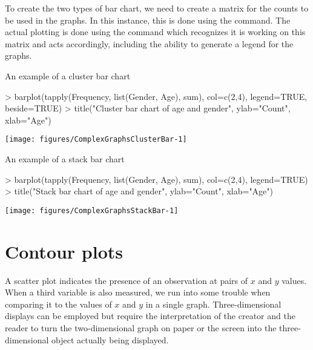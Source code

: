 To create the two types of bar chart, we need to create a matrix for the counts to be used in the graphs. In this instance, this is done using the  command. The actual plotting is done using the  command which recognizes it is working on this matrix and acts accordingly, including the ability to generate a legend for the graphs. 
\begin{exhibit} 
\begin{center} 
\caption{An example of a cluster bar chart} 
\label{ClusterBarChart} 

\begin{Schunk}
\begin{Sinput}
> barplot(tapply(Frequency, list(Gender, Age), sum), col=c(2,4), legend=TRUE, beside=TRUE) 
> title("Cluster bar chart of age and gender", ylab="Count", xlab="Age") 
\end{Sinput}

\texttt{[image: figures/ComplexGraphsClusterBar-1]} \end{Schunk}

\end{center} 
\end{exhibit} 
\begin{exhibit} 
\begin{center} 
\caption{An example of a stack bar chart} 
\label{StackBarChart} 

\begin{Schunk}
\begin{Sinput}
> barplot(tapply(Frequency, list(Gender, Age), sum), col=c(2,4), legend=TRUE) 
> title("Stack bar chart of age and gender", ylab="Count", xlab="Age") 
\end{Sinput}

\texttt{[image: figures/ComplexGraphsStackBar-1]} \end{Schunk}

\end{center} 
\end{exhibit} 
 
 
 
\section{Contour plots} 
 
A scatter plot indicates the presence of an observation at pairs of $x$ and $y$ values. When a third variable is also measured, we run into some trouble when comparing it to the values of $x$ and $y$ in a single graph. Three-dimensional displays can be employed but require the interpretation of the creator and the reader to turn the two-dimensional graph on paper or the screen into the three-dimensional object actually being displayed. 
 
